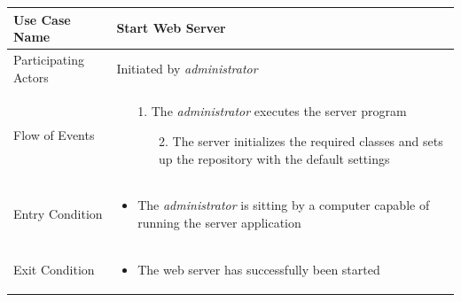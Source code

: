 \begin{center}
	\begin{tabular}{ | l | p{10cm} |  }
		 \hline
		Use Case Name & Start Web Server \\ \hline
		Participating Actors & Initiated by \emph{administrator} \\ \hline
		Flow of Events & \begin{enumerate}
						\item[1.] The \emph{administrator} executes the server program
						\begin{enumerate}
							\item[2.] The server initializes the required classes and sets up the repository with the default settings
						\end{enumerate}
					\end{enumerate} \\ \hline
		Entry Condition & \begin{itemize}
						\item The \emph{administrator} is sitting by a computer capable of running the server application
					\end{itemize} \\ \hline
		Exit Condition & \begin{itemize}
						\item The web server has successfully been started
					\end{itemize} \\
		\hline
	\end{tabular}
\end{center}

